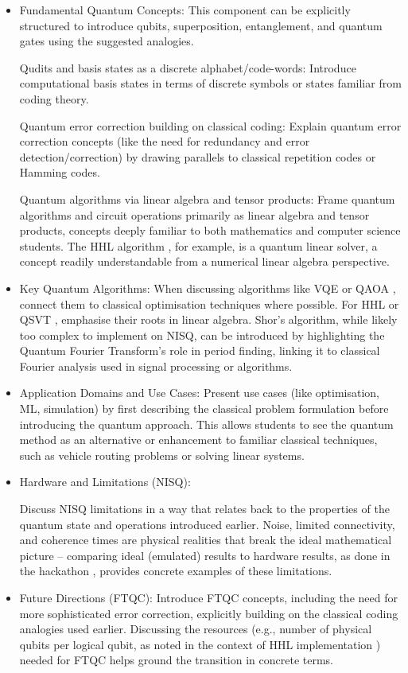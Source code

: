 \documentclass[11pt,a4paper]{article}
\begin{document}
\begin{itemize}	
	
\item Fundamental Quantum Concepts: This component
can be explicitly structured to introduce qubits, superposition, entanglement, and quantum gates using the suggested analogies.
 
Qudits and basis states as a discrete alphabet/code-words: Introduce computational basis states in terms of discrete symbols or states familiar from coding theory.

Quantum error correction building on classical coding: Explain quantum error correction concepts (like the need for redundancy and error detection/correction) by drawing parallels to classical repetition codes or Hamming codes.

Quantum algorithms via linear algebra and tensor products: Frame quantum algorithms and circuit operations primarily as linear algebra and tensor products, concepts deeply familiar to both mathematics and computer science students. The HHL algorithm
, for example, is a quantum linear solver, a concept readily understandable from a numerical linear algebra perspective.

\item Key Quantum Algorithms: When discussing algorithms like VQE or QAOA
, connect them to classical optimisation techniques where possible. For HHL or QSVT
, emphasise their roots in linear algebra. Shor's algorithm, while likely too complex to implement on NISQ, can be introduced by highlighting the Quantum Fourier Transform's role in period finding, linking it to classical Fourier analysis used in signal processing or algorithms.

\item Application Domains and Use Cases: Present use cases (like optimisation, ML, simulation)
by first describing the classical problem formulation before introducing the quantum approach. This allows students to see the quantum method as an alternative or enhancement to familiar classical techniques, such as vehicle routing problems or solving linear systems.

\item Hardware and Limitations (NISQ): 

Discuss NISQ limitations
in a way that relates back to the properties of the quantum state and operations introduced earlier. Noise, limited connectivity, and coherence times are physical realities that break the ideal mathematical picture – comparing ideal (emulated) results to hardware results, as done in the hackathon
, provides concrete examples of these limitations.

\item Future Directions (FTQC): Introduce FTQC concepts, including the need for more sophisticated error correction, explicitly building on the classical coding analogies used earlier. Discussing the resources (e.g., number of physical qubits per logical qubit, as noted in the context of HHL implementation
) needed for FTQC helps ground the transition in concrete terms.

\end{itemize}	
\end{document}
